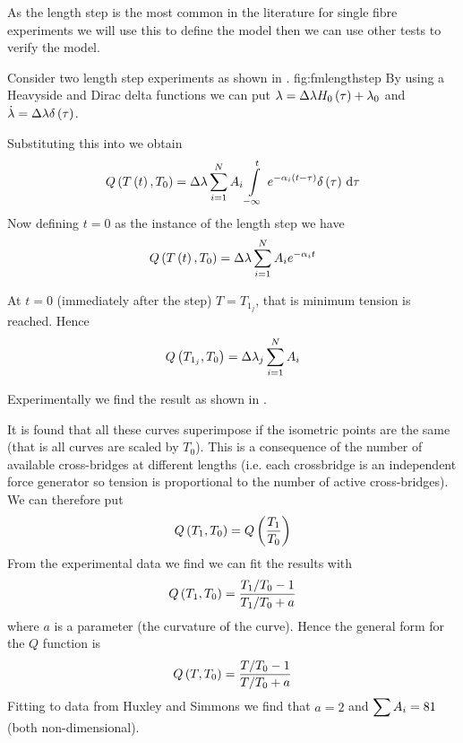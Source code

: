 As the length step is the most common in the literature for single fibre
experiments we will use this to define the model then we can use other tests to
verify the model. 

Consider two length step experiments as shown in .
{fig:fmlengthstep}
By using a Heavyside and Dirac delta functions we can put
$\lambda=\Delta\lambda  H_{0}\left( \tau \right) +\lambda_{0}$ and
$\dot{\lambda}=\Delta\lambda \delta\left( \tau \right) $. 

Substituting this into
 we obtain
\begin{equation*}
  \fnof{Q}{\fnof{T}{t},T_{0}}=\Delta\lambda\dsum_{i=1}^{N}A_{i}\gint{-\infty}{t}
  {e^{-\alpha_{i}\pbrac{t-\tau}}\fnof{\delta}{\tau}}{\tau}
\end{equation*}
Now defining $t=0$ as the instance of the length step we have
\begin{equation*}
   Q\left(  T\left( t \right) ,T_{0} \right) =\Delta\lambda \displaystyle\sum _{i=1}^{N}A_{i}e^{-\alpha_{i}t}
\end{equation*}

At $t=0$ (immediately after the step) $T=T_{1_{j}}$, that is minimum tension
is reached. Hence
\begin{equation}
   Q\left( T_{1_{j}},T_{0} \right) =\Delta\lambda_{j} \displaystyle\sum _{i=1}^{N}A_{i}
\end{equation}

Experimentally we find the result as shown in .


It is found that all these curves superimpose if the isometric points are 
the same (that is all curves are scaled by $T_{0}$). This is a consequence of
the number of available cross-bridges at different lengths (i.e. each
crossbridge is an independent force generator so tension is proportional to
the number of active cross-bridges). We can therefore put
\begin{equation*}
   Q\left( T_{1},T_{0} \right) = Q\left( \dfrac{T_{1}}{T_{0}} \right) 
\end{equation*}
From the experimental data we find we can fit the results with
\begin{equation*}
   Q\left( T_{1},T_{0} \right) =\dfrac{T_{1}/T_{0}-1}{T_{1}/T_{0}+a}
\end{equation*}
where $a$ is a parameter (the curvature of the curve). Hence the general form
for the $Q$ function is
\begin{equation}
   Q\left( T,T_{0} \right) =\dfrac{T/T_{0}-1}{T/T_{0}+a}  
  \label{eqn:Qdefinition}
\end{equation}
Fitting to data from Huxley and Simmons we find that $a=2$ and $ \displaystyle\sum 
A_{i}=81$ (both non-dimensional). 

